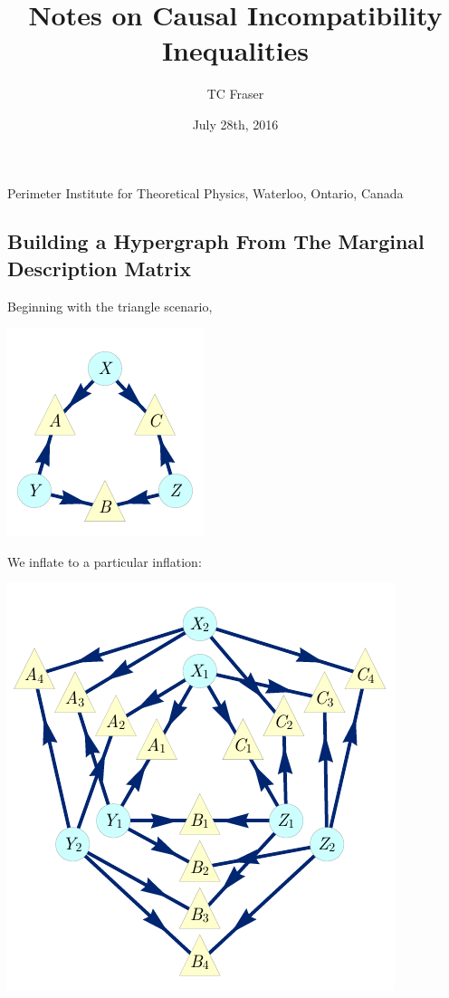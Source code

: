 \documentclass{article}
\theoremstyle{definition}
\begin{document}
    \title{Notes on Causal Incompatibility Inequalities}
    \author{TC Fraser}{Perimeter Institute for Theoretical Physics, Waterloo, Ontario, Canada}
    \date{July 28th, 2016}

    \subsection*{Building a Hypergraph From The Marginal Description Matrix}

    Beginning with the triangle scenario,

    \begin{center}
        \includegraphics{figures/TriDagRaw.pdf}
    \end{center}

    We inflate to a particular inflation:

    \begin{center}
        \includegraphics{figures/TriDagFull222.pdf}
    \end{center}
\end{document}
